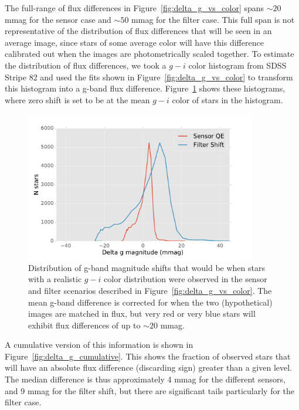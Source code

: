 \documentclass[12pt]{article}
\begin{document}
The full-range of flux differences in Figure~\ref{fig:delta_g_vs_color} spans
$\sim 20$ mmag for the sensor case and $\sim 50$ mmag for the filter case. This
full span is not representative of the distribution of flux differences that
will be seen in an average image, since stars of some average color will have
this difference calibrated out when the images are photometrically scaled
together. To estimate the distribution of flux differences, we took a $g-i$
color histogram from SDSS Stripe 82 and used the fits shown in
Figure~\ref{fig:delta_g_vs_color} to transform this histogram into a g-band flux
difference. Figure~\ref{fig:delta_g_histogram} shows these histograms, where zero
shift is set to be at the mean $g-i$ color of stars in the histogram.

\begin{figure}
\includegraphics[width=0.9\textwidth]{figures/delta_g_histogram.pdf}
\caption{Distribution of g-band magnitude shifts that would be when stars with a
realistic $g-i$ color distribution were observed in the sensor and filter
scenarios described in Figure~\ref{fig:delta_g_vs_color}. The mean g-band
difference is corrected for when the two (hypothetical) images are matched in flux,
but very red or very blue stars will exhibit flux differences of up to $\sim 20$
mmag.
\label{fig:delta_g_histogram}}
\end{figure}

A cumulative version of this information is shown in
Figure~\ref{fig:delta_g_cumulative}. This shows the fraction of observed
stars that will have an absolute flux difference (discarding sign) greater than
a given level. The median difference is thus approximately 4 mmag for the
different sensors, and 9 mmag for the filter shift, but there are significant
tails particularly for the filter case.
\end{document}
